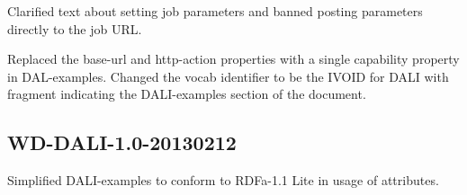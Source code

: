\documentclass[11pt,letter]{ivoa}
\begin{document}
Clarified text about setting job parameters and banned posting parameters 
directly to the job URL.

Replaced the base-url and http-action properties with a single capability 
property in DAL-examples. Changed the vocab identifier to be the IVOID for DALI 
with fragment indicating the DALI-examples section of the document.

\subsection{WD-DALI-1.0-20130212}
Simplified DALI-examples to conform to RDFa-1.1 Lite in usage of attributes.


\end{document}
